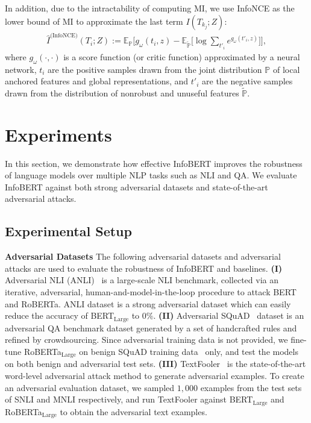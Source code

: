 \documentclass{article} \usepackage{iclr2021_conference,times}
\theoremstyle{definition}
\theoremstyle{remark}
\newcommand{\method}{InfoBERT\xspace}
\begin{document}
In addition, due to the intractability of computing MI, we use InfoNCE \citep{infonce} as the lower bound of MI to approximate the last term $I(T_{k_j};Z)$:
\begin{align}
    \label{eq:local}
    \hat{I}^{\text{(InfoNCE})}(T_i; Z) := \mathbb{E_P}\Bigg[g_{\omega}(t_i, z) -  \mathbb{E}_{\mathbb{\tilde{P}}} \Big[ \log \sum_{t'_i} e^{g_{\omega}(t'_i, z)} \Big] \Bigg],
\end{align}
where $g_\omega(\cdot, \cdot)$ is a score function (or critic function) approximated by a neural network, $t_i$ are the positive samples drawn from the joint distribution $\mathbb{P}$ of local anchored features and global representations,  and $t'_i$ are the negative samples drawn from  the distribution of nonrobust and unuseful features $\mathbb{\tilde{P}}$. \section{Experiments}\label{sec:exp}
In this section, we demonstrate how effective \method improves the robustness of language models over multiple NLP tasks such as NLI and QA. We evaluate \method against both strong adversarial datasets and state-of-the-art adversarial attacks.\subsection{Experimental Setup}
\textbf{Adversarial Datasets} The following adversarial datasets and adversarial attacks are used to evaluate the robustness of \method and baselines.
\textbf{(I)} Adversarial NLI (ANLI)~\citep{anli} is a large-scale NLI benchmark, collected via an iterative, adversarial, human-and-model-in-the-loop procedure to attack BERT and RoBERTa. ANLI dataset is a strong adversarial dataset which can easily reduce the  accuracy of BERT$_{\text{Large}}$ to $0\%$. 
\textbf{(II)} Adversarial SQuAD~\citep{advsquad} dataset is an adversarial QA benchmark dataset generated by a set of handcrafted rules and refined by crowdsourcing. Since adversarial training data is not provided, we fine-tune RoBERTa$_{\text{Large}}$ on benign SQuAD training data~\citep{squad} only, and test the models on both benign and adversarial test sets. 
\textbf{(III)} TextFooler~\citep{textfooler} is the state-of-the-art word-level adversarial attack method to generate adversarial examples. To create an adversarial evaluation dataset, we sampled $1,000$ examples from the test sets of SNLI and MNLI respectively, and run TextFooler against BERT$_{\text{Large}}$ and RoBERTa$_{\text{Large}}$ to obtain the adversarial text examples.
\end{document}
